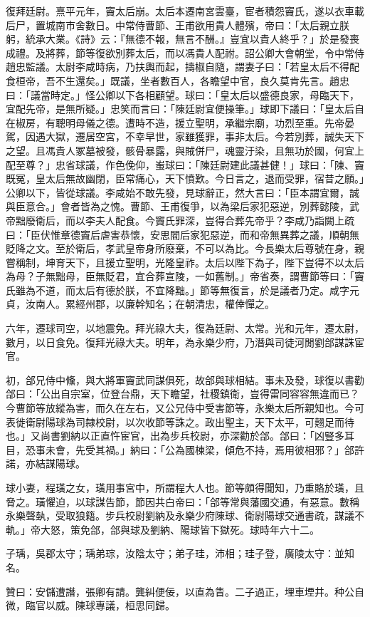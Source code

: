 \begin{pinyinscope}
復拜廷尉。熹平元年，竇太后崩。太后本遷南宮雲臺，宦者積怨竇氏，遂以衣車載后尸，置城南市舍數日。中常侍曹節、王甫欲用貴人體殯，帝曰：「太后親立朕躬，統承大業。《詩》云：『無德不報，無言不酬。』豈宜以貴人終乎？」於是發喪成禮。及將葬，節等復欲別葬太后，而以馮貴人配祔。詔公卿大會朝堂，令中常侍趙忠監議。太尉李咸時病，乃扶輿而起，擣椒自隨，謂妻子曰：「若皇太后不得配食桓帝，吾不生還矣。」既議，坐者數百人，各瞻望中官，良久莫肯先言。趙忠曰：「議當時定。」怪公卿以下各相顧望。球曰：「皇太后以盛德良家，母臨天下，宜配先帝，是無所疑。」忠笑而言曰：「陳廷尉宜便操筆。」球即下議曰：「皇太后自在椒房，有聰明母儀之德。遭時不造，援立聖明，承繼宗廟，功烈至重。先帝晏駕，因遇大獄，遷居空宮，不幸早世，家雖獲罪，事非太后。今若別葬，誠失天下之望。且馮貴人冢墓被發，骸骨暴露，與賊併尸，魂靈汙染，且無功於國，何宜上配至尊？」忠省球議，作色俛仰，蚩球曰：「陳廷尉建此議甚健！」球曰：「陳、竇既冤，皇太后無故幽閉，臣常痛心，天下憤歎。今日言之，退而受罪，宿昔之願。」公卿以下，皆從球議。李咸始不敢先發，見球辭正，然大言曰：「臣本謂宜爾，誠與臣意合。」會者皆為之愧。曹節、王甫復爭，以為梁后家犯惡逆，別葬懿陵，武帝黜廢衛后，而以李夫人配食。今竇氏罪深，豈得合葬先帝乎？李咸乃詣闕上疏曰：「臣伏惟章德竇后虐害恭懷，安思閻后家犯惡逆，而和帝無異葬之議，順朝無貶降之文。至於衛后，孝武皇帝身所廢棄，不可以為比。今長樂太后尊號在身，親嘗稱制，坤育天下，且援立聖明，光隆皇祚。太后以陛下為子，陛下豈得不以太后為母？子無黜母，臣無貶君，宜合葬宣陵，一如舊制。」帝省奏，謂曹節等曰：「竇氏雖為不道，而太后有德於朕，不宜降黜。」節等無復言，於是議者乃定。咸字元貞，汝南人。累經州郡，以廉幹知名；在朝清忠，權倖憚之。

六年，遷球司空，以地震免。拜光祿大夫，復為廷尉、太常。光和元年，遷太尉，數月，以日食免。復拜光祿大夫。明年，為永樂少府，乃潛與司徒河閒劉郃謀誅宦官。

初，郃兄侍中儵，與大將軍竇武同謀俱死，故郃與球相結。事未及發，球復以書勸郃曰：「公出自宗室，位登台鼎，天下瞻望，社稷鎮衛，豈得雷同容容無違而已？今曹節等放縱為害，而久在左右，又公兄侍中受害節等，永樂太后所親知也。今可表徙衛尉陽球為司隸校尉，以次收節等誅之。政出聖主，天下太平，可翹足而待也。」又尚書劉納以正直忤宦官，出為步兵校尉，亦深勸於郃。郃曰：「凶豎多耳目，恐事未會，先受其禍。」納曰：「公為國棟梁，傾危不持，焉用彼相邪？」郃許諾，亦結謀陽球。

球小妻，程璜之女，璜用事宮中，所謂程大人也。節等頗得聞知，乃重賂於璜，且脅之。璜懼迫，以球謀告節，節因共白帝曰：「郃等常與藩國交通，有惡意。數稱永樂聲埶，受取狼籍。步兵校尉劉納及永樂少府陳球、衛尉陽球交通書疏，謀議不軌。」帝大怒，策免郃，郃與球及劉納、陽球皆下獄死。球時年六十二。

子瑀，吳郡太守；瑀弟琮，汝陰太守；弟子珪，沛相；珪子登，廣陵太守：並知名。

贊曰：安儲遭譖，張卿有請。龔糾便佞，以直為眚。二子過正，埋車堙井。种公自微，臨官以威。陳球專議，桓思同歸。


\end{pinyinscope}